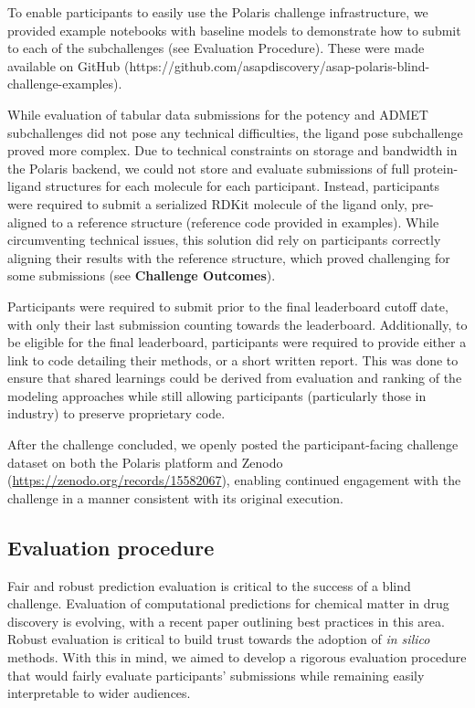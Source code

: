 \documentclass[journal=jcim,manuscript=article]{achemso}
\begin{document}
{To enable participants to easily use the Polaris challenge infrastructure, we provided example notebooks with baseline models to demonstrate how to submit to each of the subchallenges (see Evaluation Procedure). These were made available on GitHub (https://github.com/asapdiscovery/asap-polaris-blind-challenge-examples). 

While evaluation of tabular data submissions for the potency and ADMET subchallenges did not pose any technical difficulties, the ligand pose subchallenge proved more complex. Due to technical constraints on storage and bandwidth in the Polaris backend, we could not store and evaluate submissions of full protein-ligand structures for each molecule for each participant. Instead, participants were required to submit a serialized RDKit molecule of the ligand only, pre-aligned to a reference structure (reference code provided in examples). While circumventing technical issues, this solution did rely on participants correctly aligning their results with the reference structure, which proved challenging for some submissions (see \textbf{Challenge Outcomes}).

Participants were required to submit prior to the final leaderboard cutoff date, with only their last submission counting towards the leaderboard. Additionally, to be eligible for the final leaderboard, participants were required to provide either a link to code detailing their methods, or a short written report. This was done to ensure that shared learnings could be derived from evaluation and ranking of the modeling approaches while still allowing participants (particularly those in industry) to preserve proprietary code. 

After the challenge concluded, we openly posted the participant-facing challenge dataset on both the Polaris platform and Zenodo (\url{https://zenodo.org/records/15582067}), enabling continued engagement with the challenge in a manner consistent with its original execution.


\subsection{Evaluation procedure}    

Fair and robust prediction evaluation is critical to the success of a blind challenge\cite{sampl6_2018}. Evaluation of computational predictions for chemical matter in drug discovery is evolving, with a recent paper outlining best practices in this area\cite{ash_practically_2024}. Robust evaluation is critical to build trust towards the adoption of \textit{in silico} methods. With this in mind, we aimed to develop a rigorous evaluation procedure that would fairly evaluate participants' submissions while remaining easily interpretable to wider audiences.

}
\end{document}
